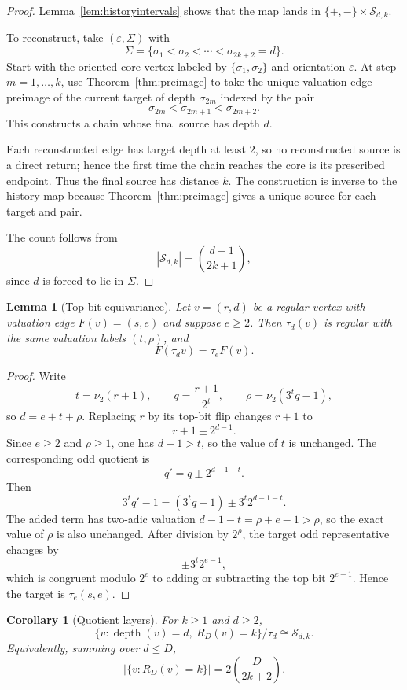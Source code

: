 \documentclass[11pt]{amsart}
\newtheorem{lemma}[theorem]{Lemma}
\newtheorem{corollary}[theorem]{Corollary}
\theoremstyle{definition}
\theoremstyle{remark}
\newcommand{\nuu}{\nu_2}
\newcommand{\depth}{\operatorname{depth}}
\newcommand{\Sfam}{\mathcal S}
\newcommand{\eps}{\varepsilon}
\begin{document}
\begin{proof}
Lemma~\ref{lem:historyintervals} shows that the map lands in $\{+,-\}\times\Sfam_{d,k}$.

To reconstruct, take $(\eps,\Sigma)$ with
\[
\Sigma=\{\sigma_1<\sigma_2<\cdots<\sigma_{2k+2}=d\}.
\]
Start with the oriented core vertex labeled by $\{\sigma_1,\sigma_2\}$ and orientation $\eps$.  At step $m=1,\ldots,k$, use Theorem~\ref{thm:preimage} to take the unique valuation-edge preimage of the current target of depth $\sigma_{2m}$ indexed by the pair
\[
\sigma_{2m}<\sigma_{2m+1}<\sigma_{2m+2}.
\]
This constructs a chain whose final source has depth $d$.

Each reconstructed edge has target depth at least $2$, so no reconstructed source is a direct return; hence the first time the chain reaches the core is its prescribed endpoint.  Thus the final source has distance $k$.  The construction is inverse to the history map because Theorem~\ref{thm:preimage} gives a unique source for each target and pair.

The count follows from
\[
|\Sfam_{d,k}|=\binom{d-1}{2k+1},
\]
since $d$ is forced to lie in $\Sigma$.
\end{proof}

\begin{lemma}[Top-bit equivariance]\label{lem:topbit}
Let $v=(r,d)$ be a regular vertex with valuation edge $F(v)=(s,e)$ and suppose $e\ge2$.  Then $\tau_d(v)$ is regular with the same valuation labels $(t,\rho)$, and
\[
F(\tau_d v)=\tau_e F(v).
\]
\end{lemma}

\begin{proof}
Write
\[
t=\nuu(r+1),\qquad q=\frac{r+1}{2^t},\qquad \rho=\nuu(3^tq-1),
\]
so $d=e+t+\rho$.  Replacing $r$ by its top-bit flip changes $r+1$ to
\[
r+1\pm2^{d-1}.
\]
Since $e\ge2$ and $\rho\ge1$, one has $d-1>t$, so the value of $t$ is unchanged.  The corresponding odd quotient is
\[
q'=q\pm2^{d-1-t}.
\]
Then
\[
3^tq'-1=(3^tq-1)\pm3^t2^{d-1-t}.
\]
The added term has two-adic valuation $d-1-t=\rho+e-1>\rho$, so the exact value of $\rho$ is also unchanged.  After division by $2^\rho$, the target odd representative changes by
\[
\pm 3^t2^{e-1},
\]
which is congruent modulo $2^e$ to adding or subtracting the top bit $2^{e-1}$.  Hence the target is $\tau_e(s,e)$.
\end{proof}

\begin{corollary}[Quotient layers]\label{cor:quotient}
For $k\ge1$ and $d\ge2$,
\[
\{v:\depth(v)=d,\ R_D(v)=k\}/\tau_d
\cong
\Sfam_{d,k}.
\]
Equivalently, summing over $d\le D$,
\[
\bigl|\{v:R_D(v)=k\}\bigr|=2\binom{D}{2k+2}.
\]
\end{corollary}
\end{document}
